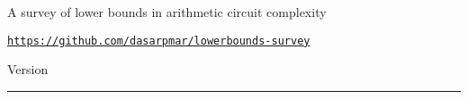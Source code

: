 \documentclass[12pt]{report}
\author{%
    Ramprasad Saptharishi \\
    Tel Aviv University \\
    \texttt{ramprasad@cmi.ac.in}
    }
\makeatletter
\def\printauthor{%
    {\large \@author}}
\makeatother
\begin{document}
\begin{titlepage}
\noindent
\vspace*{1cm}

\titlefont A survey of lower bounds in arithmetic circuit complexity
\epigraph{\tt \url{https://github.com/dasarpmar/lowerbounds-survey}}{Version \currentversion}
\null\vfill
\vspace*{1cm}
\noindent
\hfill
\begin{minipage}{0.50\linewidth}
    \begin{flushright}

      \vspace*{1cm}

        \printauthor

        \ccbyncsa


    \end{flushright}
\end{minipage}
%
\begin{minipage}{0.02\linewidth}
    \rule{1pt}{100pt}
\end{minipage}
\end{titlepage}



\end{document}
